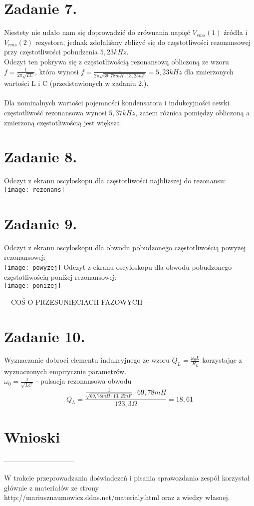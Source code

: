 \documentclass[polish,a4paper]{article}
\begin{document}
\section{Zadanie 7.}
Niestety nie udało nam się doprowadzić do zrównania napięć $V_{rms}(1)$ źródła i $V_{rms}(2)$ rezystora, jednak zdołaliśmy zbliżyć się do częstotliwości rezonansowej przy częstotliwości pobudzenia $5,23kHz$.\\
Odczyt ten pokrywa się z częstotliwością rezonansową obliczoną ze wzoru $f=\frac{1}{2\pi\sqrt{LC}}$, która wynosi $f=\frac{1}{2\pi\sqrt{69,78mH\cdot13,25nF}} = 5,23kHz$ dla zmierzonych wartości L i C (przedstawionych w zadaniu 2.). \\
\\Dla nominalnych wartości pojemności kondensatora i indukcyjności cewki częstotliwość rezonansowa wynosi $5,37kHz$, zatem różnica pomiędzy obliczoną a zmierzoną częstotliwością jest większa.

\section{Zadanie 8.}
Odczyt z ekranu oscyloskopu dla częstotliwości najbliższej do rezonansu:\\
\texttt{[image: rezonans]}

\section{Zadanie 9.}
Odczyt z ekranu oscyloskopu dla obwodu pobudzonego częstotliwością powyżej rezonansowej:\\
\texttt{[image: powyzej]}
\newpage
Odczyt z ekranu oscyloskopu dla obwodu pobudzonego częstotliwością poniżej rezonansowej:\\
\texttt{[image: ponizej]}

---COŚ O PRZESUNIĘCIACH FAZOWYCH---

\section{Zadanie 10.}
Wyznaczanie dobroci elementu indukcyjnego ze wzoru $Q_{L} = \frac{\omega_{0}L}{R_{L}}$ korzystając z wyznaczonych empirycznie parametrów.\\
$\omega_{0}=\frac{1}{\sqrt{LC}}$ - pulsacja rezonansowa obwodu
$$
Q_{L} = \frac{\frac{1}{\sqrt{69,78mH\cdot13,25nF}}\cdot69,78mH}{123,3\Omega} = 18,61
$$



\section{Wnioski}
------------------------------





\begin{thebibliography}{9}

  W trakcie przeprowadzania doświadczeń i pisania sprawozdania zespół korzystał głównie z materiałów ze strony http://mariusznaumowicz.ddns.net/materialy.html oraz z wiedzy własnej.

\end{thebibliography}
\end{document}
